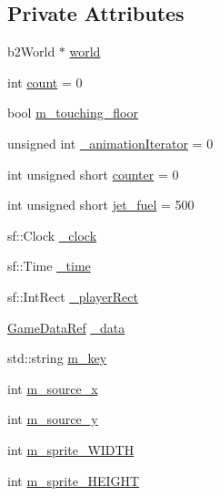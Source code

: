 \subsection*{Private Attributes}
\begin{DoxyCompactItemize}
\item 
b2\+World $\ast$ \hyperlink{classSekander_1_1Main__Player_af8df5e326eb1b6fc0d6d55272b2777c4}{world}
\item 
int \hyperlink{classSekander_1_1Main__Player_ab1cbaca430daaf9032034f057cc34684}{count} = 0
\item 
bool \hyperlink{classSekander_1_1Main__Player_af1dd80ff5a526e7f46b53ad6b10d3b64}{m\+\_\+touching\+\_\+floor}
\item 
unsigned int \hyperlink{classSekander_1_1Main__Player_a795f1a418617738a2732df46747fc1ab}{\+\_\+animation\+Iterator} = 0
\item 
int unsigned short \hyperlink{classSekander_1_1Main__Player_a02b244af7c3da401d40b6793f78ebd30}{counter} = 0
\item 
int unsigned short \hyperlink{classSekander_1_1Main__Player_a693be2cc7848f8887f8b30e9c84158f8}{jet\+\_\+fuel} = 500
\item 
sf\+::\+Clock \hyperlink{classSekander_1_1Main__Player_aee32dcab4db0b7b79aa812dd2947022d}{\+\_\+clock}
\item 
sf\+::\+Time \hyperlink{classSekander_1_1Main__Player_abf3ac1a3614799b6361d1e2676b13144}{\+\_\+time}
\item 
sf\+::\+Int\+Rect \hyperlink{classSekander_1_1Main__Player_a3a69070e71c8c0dafeb24763875697a9}{\+\_\+player\+Rect}
\item 
\hyperlink{namespaceSekander_a1d69b002ba2d23020901c28f0def5e16}{Game\+Data\+Ref} \hyperlink{classSekander_1_1Main__Player_ab103c1a0eda92b779b5df40d40ad38a3}{\+\_\+data}
\item 
std\+::string \hyperlink{classSekander_1_1Main__Player_a33cc5e2d4e6462a9de31fc2cddeb946b}{m\+\_\+key}
\item 
int \hyperlink{classSekander_1_1Main__Player_a47403c71e431a9b99d6f32fb62d2becb}{m\+\_\+source\+\_\+x}
\item 
int \hyperlink{classSekander_1_1Main__Player_ac4b907b68f4a7eb0b52d4b9ae82ef0e8}{m\+\_\+source\+\_\+y}
\item 
int \hyperlink{classSekander_1_1Main__Player_a922780a2bd4eb58f98b8db35cb1fda64}{m\+\_\+sprite\+\_\+\+W\+I\+D\+TH}
\item 
int \hyperlink{classSekander_1_1Main__Player_ad5c2af058f12023fbc614fe0ee6a08bc}{m\+\_\+sprite\+\_\+\+H\+E\+I\+G\+HT}

\end{DoxyCompactItemize}
